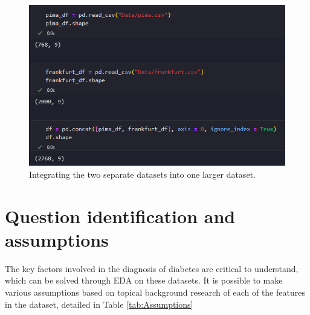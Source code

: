 \documentclass[12pt]{report}
\begin{document}
\begin{figure}[H]
    \centering
    \includegraphics[width=\linewidth]{Integration.png}
    \caption{Integrating the two separate datasets into one larger dataset.}
    \label{fig:Integration}
\end{figure}

\pagebreak 

\section{Question identification and assumptions}
The key factors involved in the diagnosis of diabetes are critical to understand, which 
can be solved through EDA on these datasets. It is possible to make various assumptions based 
on topical background research of each of the features in the dataset, detailed in Table \ref{tab:Assumptions}
\end{document}

